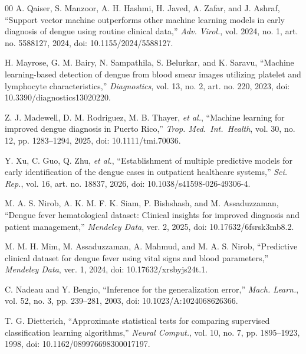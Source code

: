 \documentclass[conference]{IEEEtran}
\begin{document}
\begin{thebibliography}{00}
A. Qaiser, S. Manzoor, A. H. Hashmi, H. Javed, A. Zafar,
and J. Ashraf,
``Support vector machine outperforms other machine learning models
in early diagnosis of dengue using routine clinical data,''
\emph{Adv. Virol.}, vol. 2024, no. 1,
art. no. 5588127, 2024,
doi: 10.1155/2024/5588127.

H. Mayrose, G. M. Bairy, N. Sampathila, S. Belurkar,
and K. Saravu,
``Machine learning-based detection of dengue from blood smear images
utilizing platelet and lymphocyte characteristics,''
\emph{Diagnostics}, vol. 13, no. 2, art. no. 220, 2023,
doi: 10.3390/diagnostics13020220.

Z. J. Madewell, D. M. Rodriguez, M. B. Thayer, \emph{et al.},
``Machine learning for improved dengue diagnosis in Puerto Rico,''
\emph{Trop. Med.\ Int.\ Health}, vol. 30, no. 12,
pp. 1283--1294, 2025,
doi: 10.1111/tmi.70036.

Y. Xu, C. Guo, Q. Zhu, \emph{et al.},
``Establishment of multiple predictive models for early identification
of the dengue cases in outpatient healthcare systems,''
\emph{Sci. Rep.}, vol. 16, art. no. 18837, 2026,
doi: 10.1038/s41598-026-49306-4.

M. A. S. Nirob, A. K. M. F. K. Siam, P. Bishshash,
and M. Assaduzzaman,
``Dengue fever hematological dataset: Clinical insights for improved
diagnosis and patient management,''
\emph{Mendeley Data}, ver. 2, 2025,
doi: 10.17632/6fsrsk3mb8.2.

M. M. H. Mim, M. Assaduzzaman, A. Mahmud, and
M. A. S. Nirob,
``Predictive clinical dataset for dengue fever using vital signs and
blood parameters,''
\emph{Mendeley Data}, ver. 1, 2024,
doi: 10.17632/xrsbyjs24t.1.

C. Nadeau and Y. Bengio,
``Inference for the generalization error,''
\emph{Mach. Learn.}, vol. 52, no. 3, pp. 239--281, 2003,
doi: 10.1023/A:1024068626366.

T. G. Dietterich,
``Approximate statistical tests for comparing supervised classification
learning algorithms,''
\emph{Neural Comput.}, vol. 10, no. 7, pp. 1895--1923, 1998,
doi: 10.1162/089976698300017197.

\end{thebibliography}
\end{document}
